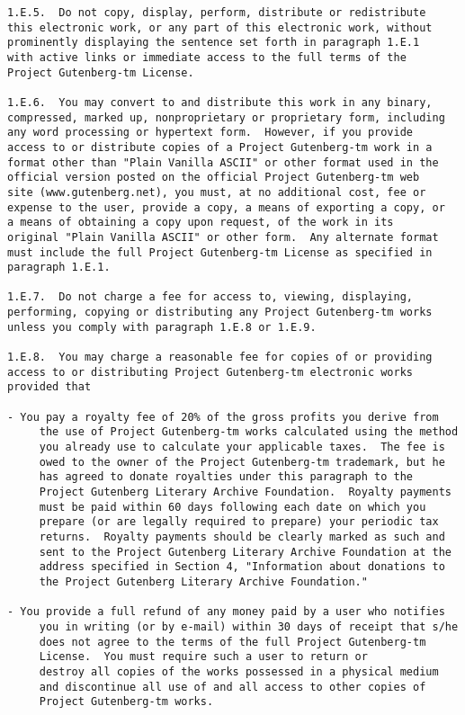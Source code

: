 \documentclass[oneside,12pt]{book}
\begin{document}
\begin{verbatim}
1.E.5.  Do not copy, display, perform, distribute or redistribute
this electronic work, or any part of this electronic work, without
prominently displaying the sentence set forth in paragraph 1.E.1
with active links or immediate access to the full terms of the
Project Gutenberg-tm License.

1.E.6.  You may convert to and distribute this work in any binary,
compressed, marked up, nonproprietary or proprietary form, including
any word processing or hypertext form.  However, if you provide
access to or distribute copies of a Project Gutenberg-tm work in a
format other than "Plain Vanilla ASCII" or other format used in the
official version posted on the official Project Gutenberg-tm web
site (www.gutenberg.net), you must, at no additional cost, fee or
expense to the user, provide a copy, a means of exporting a copy, or
a means of obtaining a copy upon request, of the work in its
original "Plain Vanilla ASCII" or other form.  Any alternate format
must include the full Project Gutenberg-tm License as specified in
paragraph 1.E.1.

1.E.7.  Do not charge a fee for access to, viewing, displaying,
performing, copying or distributing any Project Gutenberg-tm works
unless you comply with paragraph 1.E.8 or 1.E.9.

1.E.8.  You may charge a reasonable fee for copies of or providing
access to or distributing Project Gutenberg-tm electronic works
provided that

- You pay a royalty fee of 20% of the gross profits you derive from
     the use of Project Gutenberg-tm works calculated using the method
     you already use to calculate your applicable taxes.  The fee is
     owed to the owner of the Project Gutenberg-tm trademark, but he
     has agreed to donate royalties under this paragraph to the
     Project Gutenberg Literary Archive Foundation.  Royalty payments
     must be paid within 60 days following each date on which you
     prepare (or are legally required to prepare) your periodic tax
     returns.  Royalty payments should be clearly marked as such and
     sent to the Project Gutenberg Literary Archive Foundation at the
     address specified in Section 4, "Information about donations to
     the Project Gutenberg Literary Archive Foundation."

- You provide a full refund of any money paid by a user who notifies
     you in writing (or by e-mail) within 30 days of receipt that s/he
     does not agree to the terms of the full Project Gutenberg-tm
     License.  You must require such a user to return or
     destroy all copies of the works possessed in a physical medium
     and discontinue all use of and all access to other copies of
     Project Gutenberg-tm works.


\end{verbatim}
\end{document}
